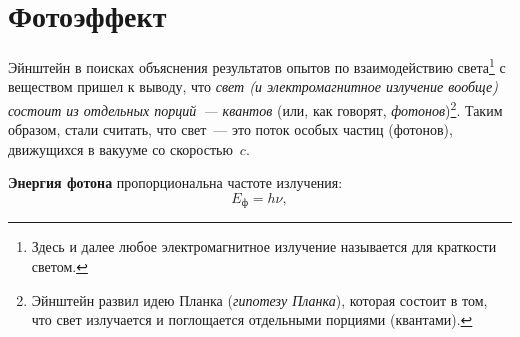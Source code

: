 \documentclass[main.tex]{subfiles}
\begin{document}

 

 

 
   

\section{Фотоэффект}


Эйнштейн в поисках объяснения результатов опытов по взаимодействию света\footnote{Здесь и далее любое электромагнитное излучение называется для краткости светом.} с веществом пришел к выводу, что \emph{свет (и электромагнитное излучение вообще) состоит из отдельных порций~--- квантов} (или, как говорят, \emph{фотонов})\footnote{Эйнштейн развил идею Планка (\emph{гипотезу Планка}), которая состоит в том, что свет излучается и поглощается отдельными порциями (квантами).}. Таким образом, стали считать, что свет~--- это поток особых частиц (фотонов), движущихся в вакууме со скоростью~$c$.

\textbf{Энергия фотона} пропорциональна частоте излучения:
\begin{equation}
    E_\text{ф}=h\nu,
\end{equation}
\end{document}
